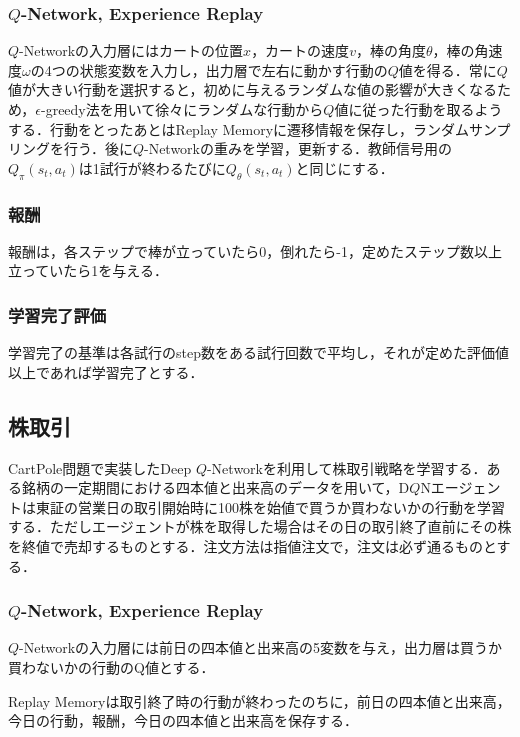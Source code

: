 \documentclass[twocolumn]{jarticle}
\begin{document}
        \subsubsection{$Q$-Network, Experience Replay}
        $Q$-Networkの入力層にはカートの位置$x$，カートの速度$v$，棒の角度$\theta$，棒の角速度$\omega$の4つの状態変数を入力し，出力層で左右に動かす行動の$Q$値を得る．常に$Q$値が大きい行動を選択すると，初めに与えるランダムな値の影響が大きくなるため，$\epsilon$-greedy法を用いて徐々にランダムな行動から$Q$値に従った行動を取るようする．行動をとったあとはReplay Memoryに遷移情報を保存し，ランダムサンプリングを行う．後に$Q$-Networkの重みを学習，更新する．教師信号用の$Q_\pi(s_t,a_t)$は1試行が終わるたびに$Q_\theta(s_t,a_t)$と同じにする．

        \subsubsection{報酬}
        報酬は，各ステップで棒が立っていたら0，倒れたら-1，定めたステップ数以上立っていたら1を与える．

        \subsubsection{学習完了評価}
        学習完了の基準は各試行のstep数をある試行回数で平均し，それが定めた評価値以上であれば学習完了とする．
    
    \subsection{株取引}
    CartPole問題で実装したDeep $Q$-Networkを利用して株取引戦略を学習する．ある銘柄の一定期間における四本値と出来高のデータを用いて，D$Q$Nエージェントは東証の営業日の取引開始時に100株を始値で買うか買わないかの行動を学習する．ただしエージェントが株を取得した場合はその日の取引終了直前にその株を終値で売却するものとする．注文方法は指値注文で，注文は必ず通るものとする．

        \subsubsection{$Q$-Network, Experience Replay}
        $Q$-Networkの入力層には前日の四本値と出来高の5変数を与え，出力層は買うか買わないかの行動のQ値とする．
        
        Replay Memoryは取引終了時の行動が終わったのちに，前日の四本値と出来高，今日の行動，報酬，今日の四本値と出来高を保存する．
\end{document}
